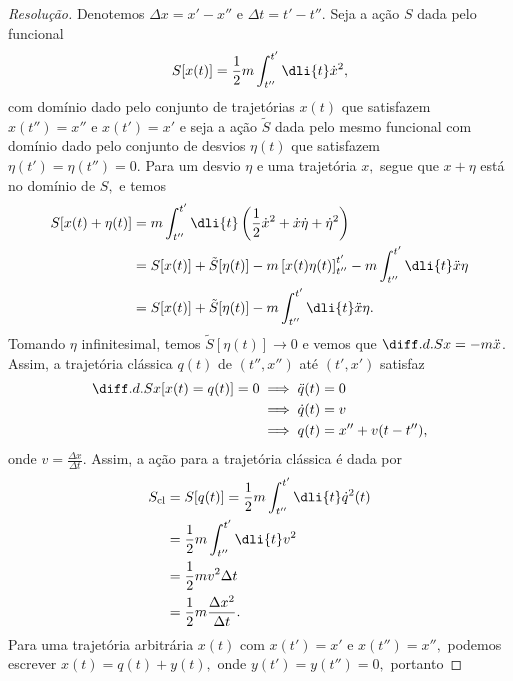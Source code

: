 \begin{proof}[Resolução]
   Denotemos \(\Delta x = x' - x''\) e \(\Delta t = t' - t''\). Seja a ação \(S\) dada pelo funcional
   \begin{equation*}
      S[x(t)] = \frac12 m \int_{t''}^{t'} \dli{t} \dot{x}^2,
   \end{equation*}
   com domínio dado pelo conjunto de trajetórias \(x(t)\) que satisfazem \(x(t'') = x''\) e \(x(t') = x'\) e seja a ação \(\tilde{S}\) dada pelo mesmo funcional com domínio dado pelo conjunto de desvios \(\eta(t)\) que satisfazem \(\eta(t') = \eta(t'') = 0\). Para um desvio \(\eta\) e uma trajetória \(x,\) segue que \(x + \eta\) está no domínio de \(S,\) e temos
   \begin{align*}
      S[x(t) + \eta(t)] &= m \int_{t''}^{t'} \dli{t} \left(\frac12 \dot{x}^2 + \dot{x} \dot\eta + \dot{\eta}^2\right)\\
                        &= S[x(t)] + \tilde{S}[\eta(t)] - m\left[x(t) \eta(t)\right]_{t''}^{t'} - m \int_{t''}^{t'} \dli{t} \ddot{x} \eta\\
                        &= S[x(t)] + \tilde{S}[\eta(t)] - m\int_{t''}^{t'} \dli{t} \ddot{x} \eta.
   \end{align*}
   Tomando \(\eta\) infinitesimal, temos \(\tilde{S}[\eta(t)] \to 0\) e vemos que \(\diff.d.{S}{x} = -m\ddot{x}\). Assim, a trajetória clássica \(q(t)\) de \((t'', x'')\) até \((t', x')\) satisfaz
   \begin{align*}
      \diff.d.{S}{x}[x(t) = q(t)] = 0 &\implies \ddot{q}(t) = 0\\
                                      &\implies \dot{q}(t) = v\\
                                      &\implies q(t) = x'' + v(t - t''),
   \end{align*}
   onde \(v = \frac{\Delta x}{\Delta t}\). Assim, a ação para a trajetória clássica é dada por
   \begin{align*}
      S_{\mathrm{cl}} &= S[q(t)] = \frac12 m\int_{t''}^{t'} \dli{t} \dot{q}^2(t)\\
                      &= \frac12 m \int_{t''}^{t'} \dli{t} v^2\\
                      &= \frac12 m v^2 \Delta t\\
                      &= \frac12 m \frac{\Delta x^2}{\Delta t}.
   \end{align*}
   Para uma trajetória arbitrária \(x(t)\) com \(x(t') = x'\) e \(x(t'') = x'',\) podemos escrever \(x(t) = q(t) + y(t),\) onde \(y(t') = y(t'') = 0,\) portanto

\end{proof}
